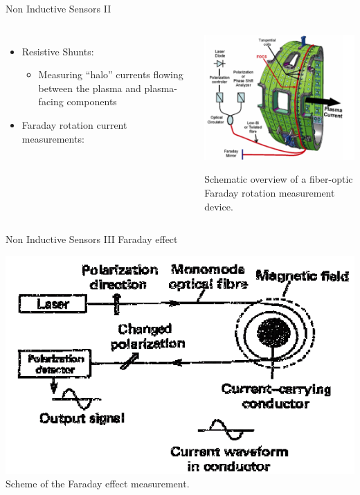\documentclass{beamer}
\begin{document}
\begin{frame}{Non Inductive Sensors II}{}
	\begin{columns}
  	     	\begin{itemize}
			\item Resistive Shunts:
 		     	\begin{itemize}
				\item  Measuring “halo” currents flowing between the plasma and plasma-facing components
			\end{itemize}
			\item Faraday  rotation current  measurements:
		\end{itemize}
			\begin{center}
				\includegraphics[width=0.8 \columnwidth]{Faraday.png}

				{\tiny  Schematic overview of a fiber-optic Faraday rotation measurement device.}
			\end{center}
 	 \end{columns}
\end{frame}

\begin{frame}{Non Inductive Sensors III}{ Faraday effect}
	\begin{center}
		\includegraphics[width=0.8 \columnwidth]{Faraday2.png}
		{\tiny  Scheme of the Faraday effect measurement.}
	\end{center}
\end{frame}
\end{document}
